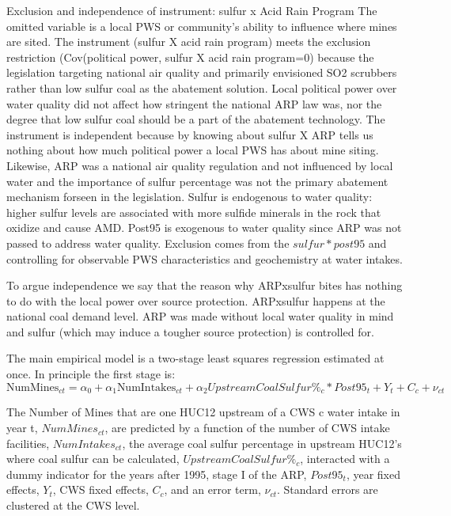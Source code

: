 \documentclass{article}
\begin{document}
Exclusion and independence of instrument: sulfur x Acid Rain Program
The omitted variable is a local PWS or community's ability to influence where mines are sited. The instrument (sulfur X acid rain program) meets the exclusion restriction (Cov(political power, sulfur X acid rain program=0) because the legislation targeting national air quality and primarily envisioned SO2 scrubbers rather than low sulfur coal as the abatement solution. Local political power over water quality did not affect how stringent the national ARP law was, nor the degree that low sulfur coal should be a part of the abatement technology. The instrument is independent because by knowing about sulfur X ARP tells us nothing about how much political power a local PWS has about mine siting. Likewise, ARP was a national air quality regulation and not influenced by local water and the importance of sulfur percentage was not the primary abatement mechanism forseen in the legislation. Sulfur is endogenous to water quality: higher sulfur levels are associated with more sulfide minerals in the rock that oxidize and cause AMD. Post95 is exogenous to water quality since ARP was not passed to address water quality. Exclusion comes from the $sulfur*post95$ and controlling for observable PWS characteristics and geochemistry at water intakes.

To argue independence we say that the reason why ARPxsulfur bites has nothing to do with the local power over source protection. ARPxsulfur happens at the national coal demand level. ARP was made without local water quality in mind and sulfur (which may induce a tougher source protection) is controlled for.

The main empirical model is a two-stage least squares regression estimated at once. In principle the first stage is:
\begin{equation}
\text{NumMines}_{ct}=\alpha_0+\alpha_1\text{NumIntakes}_{ct}+ \alpha_2UpstreamCoalSulfur\%_c*Post95_t+ Y_t+C_c+\nu_{ct}    
\end{equation}

The Number of Mines that are one HUC12 upstream of a CWS c water intake in year t, $NumMines_{ct}$, are predicted by a function of the number of CWS intake facilities, $NumIntakes_{ct}$, the average coal sulfur percentage in upstream HUC12's where coal sulfur can be calculated, $UpstreamCoalSulfur\%_c$, interacted with a dummy indicator for the years after 1995, stage I of the ARP, $Post95_t$, year fixed effects, $Y_t$, CWS fixed effects, $C_c$, and an error term, $\nu_{ct}$. Standard errors are clustered at the CWS level.
\end{document}
